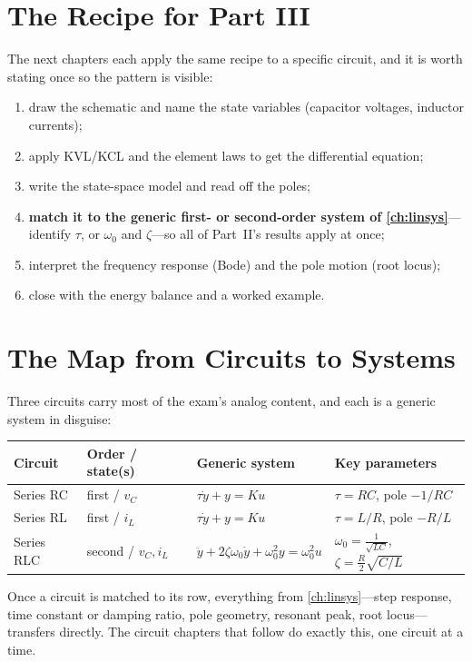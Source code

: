 \section{The Recipe for Part III}
The next chapters each apply the same recipe to a specific circuit, and it is
worth stating once so the pattern is visible:
\begin{enumerate}
\item draw the schematic and name the state variables (capacitor voltages,
inductor currents);
\item apply KVL/KCL and the element laws to get the differential equation;
\item write the state-space model and read off the poles;
\item \textbf{match it to the generic first- or second-order system of
\cref{ch:linsys}}---identify \(\tau\), or \(\omega_0\) and \(\zeta\)---so all of
Part~II's results apply at once;
\item interpret the frequency response (Bode) and the pole motion (root locus);
\item close with the energy balance and a worked example.
\end{enumerate}

\section{The Map from Circuits to Systems}
Three circuits carry most of the exam's analog content, and each is a generic
system in disguise:

\begin{center}
\begin{tabularx}{\textwidth}{@{}L{0.15\textwidth}L{0.19\textwidth}L{0.24\textwidth}Y@{}}
\toprule
Circuit & Order / state(s) & Generic system & Key parameters \\
\midrule
Series RC & first / \(v_C\) & \(\tau\dot y+y=Ku\) & \(\tau=RC\), pole \(-1/RC\) \\
Series RL & first / \(i_L\) & \(\tau\dot y+y=Ku\) & \(\tau=L/R\), pole \(-R/L\) \\
Series RLC & second / \(v_C,i_L\) & \(\ddot y+2\zeta\omega_0\dot y+\omega_0^2 y=\omega_0^2u\) & \(\omega_0=\tfrac{1}{\sqrt{LC}}\), \(\zeta=\tfrac{R}{2}\sqrt{C/L}\) \\
\bottomrule
\end{tabularx}
\end{center}

Once a circuit is matched to its row, everything from \cref{ch:linsys}---step
response, time constant or damping ratio, pole geometry, resonant peak, root
locus---transfers directly. The circuit chapters that follow do exactly this,
one circuit at a time.
